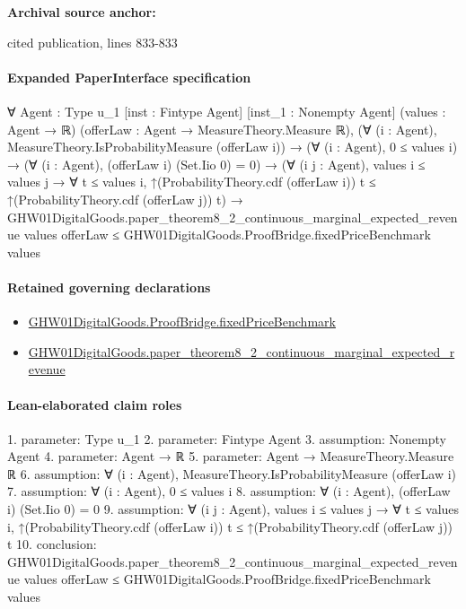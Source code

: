 \documentclass[10pt]{article}
\begin{document}
\textbf{Archival source anchor:} {\footnotesize\raggedright cited publication, lines 833-\allowbreak{}833\par}
\paragraph{Expanded PaperInterface specification}
\begin{ReviewVerbatim}
∀ {Agent : Type u_1} [inst : Fintype Agent] [inst_1 : Nonempty Agent] (values : Agent → ℝ)
  (offerLaw : Agent → MeasureTheory.Measure ℝ),
  (∀ (i : Agent), MeasureTheory.IsProbabilityMeasure (offerLaw i)) →
    (∀ (i : Agent), 0 ≤ values i) →
      (∀ (i : Agent), (offerLaw i) (Set.Iio 0) = 0) →
        (∀ (i j : Agent),
            values i ≤ values j →
              ∀ t ≤ values i, ↑(ProbabilityTheory.cdf (offerLaw i)) t ≤ ↑(ProbabilityTheory.cdf (offerLaw j)) t) →
          GHW01DigitalGoods.paper_theorem8_2_continuous_marginal_expected_revenue values offerLaw ≤
            GHW01DigitalGoods.ProofBridge.fixedPriceBenchmark values
\end{ReviewVerbatim}

\paragraph{Retained governing declarations}
\begin{itemize}\raggedright
\item \hyperlink{governing-declaration-999c32dc6e9adaf2}{GHW01\allowbreak{}Digital\allowbreak{}Goods.\allowbreak{}Proof\allowbreak{}Bridge.\allowbreak{}fixed\allowbreak{}Price\allowbreak{}Benchmark}
\item \hyperlink{governing-declaration-c4eaca5dfe00366c}{GHW01\allowbreak{}Digital\allowbreak{}Goods.\allowbreak{}paper\_\allowbreak{}theorem8\_\allowbreak{}2\_\allowbreak{}continuous\_\allowbreak{}marginal\_\allowbreak{}expected\_\allowbreak{}revenue}
\end{itemize}
\paragraph{Lean-elaborated claim roles}\begin{ReviewVerbatim}
1. parameter: Type u_1
2. parameter: Fintype Agent
3. assumption: Nonempty Agent
4. parameter: Agent → ℝ
5. parameter: Agent → MeasureTheory.Measure ℝ
6. assumption: ∀ (i : Agent), MeasureTheory.IsProbabilityMeasure (offerLaw i)
7. assumption: ∀ (i : Agent), 0 ≤ values i
8. assumption: ∀ (i : Agent), (offerLaw i) (Set.Iio 0) = 0
9. assumption: ∀ (i j : Agent),
  values i ≤ values j →
    ∀ t ≤ values i, ↑(ProbabilityTheory.cdf (offerLaw i)) t ≤ ↑(ProbabilityTheory.cdf (offerLaw j)) t
10. conclusion: GHW01DigitalGoods.paper_theorem8_2_continuous_marginal_expected_revenue values offerLaw ≤
  GHW01DigitalGoods.ProofBridge.fixedPriceBenchmark values
\end{ReviewVerbatim}
\end{document}
